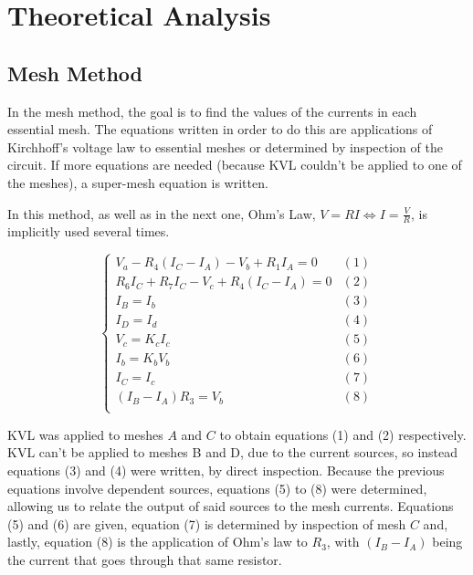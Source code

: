 \section{Theoretical Analysis}
\label{sec:analysis}
\subsection{Mesh Method}

\par
In the mesh method, the goal is to find the values of the currents in each essential mesh. The equations written in order to do this are applications of Kirchhoff's voltage law to essential meshes or determined by inspection of the circuit. If more equations are needed (because KVL couldn't be applied to one of the meshes), a super-mesh equation is written.
\par
In this method, as well as in the next one, Ohm's Law, $V=RI \Leftrightarrow I = \frac{V}{R}$, is implicitly used several times.


\begin{equation}
  \begin{cases}
    V_a - R_4 (I_C-I_A) - V_b + R_1 I_A = 0 & \mbox{$(1)$}\\
    R_6 I_C + R_7 I_C - V_c + R_4(I_C-I_A) = 0 & \mbox{$(2)$}\\
    I_B = I_b & \mbox{$(3)$}\\
    I_D = I_d & \mbox{$(4)$}\\
    V_c = K_c I_c & \mbox{$(5)$} \\
    I_b = K_b V_b & \mbox{$(6)$} \\
    I_C = I_c & \mbox{$(7)$}\\
    (I_B-I_A) R_3 = V_b & \mbox{$(8)$}\\
  \end{cases}
\end{equation}

\par
KVL was applied to meshes $A$ and $C$ to obtain equations (1) and (2) respectively. KVL can't be applied to meshes B and D, due to the current sources, so instead equations (3) and (4) were written, by direct inspection. Because the previous equations involve dependent sources, equations (5) to (8) were determined, allowing us to relate the output of said sources to the mesh currents. Equations (5) and (6) are given, equation (7) is determined by inspection of mesh $C$ and, lastly, equation (8) is the application of Ohm's law to $R_3$, with $(I_B-I_A)$ being the current that goes through that same resistor.

